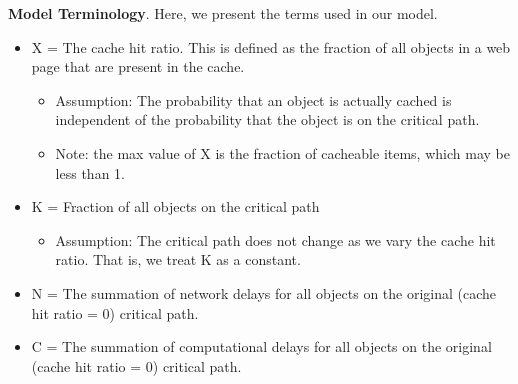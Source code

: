 \textbf{Model Terminology}. Here, we present the terms used in our model.
\begin{itemize}
\item X = The cache hit ratio. This is defined as the fraction of all objects in a web page that are present in the cache.
    \begin{itemize}
    \item Assumption: The probability that an object is actually cached is independent of the probability that the object is on the critical path.
    \item Note: the max value of X is the fraction of cacheable items, which may be less than 1. 
    \end{itemize}
\item K = Fraction of all objects on the critical path
    \begin{itemize}
    \item Assumption: The critical path does not change as we vary the cache hit ratio. That is, we treat K as a constant.
    \end{itemize}
\item N = The summation of network delays for all objects on the original (cache hit ratio = 0) critical path.
\item C = The summation of computational delays for all objects on the original (cache hit ratio = 0) critical path.
\end{itemize}


